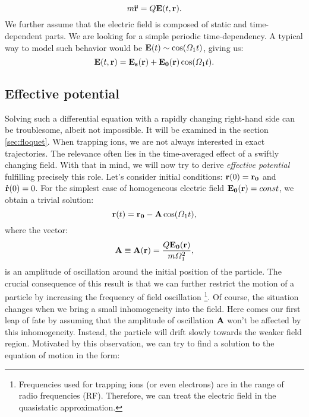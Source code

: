 \begin{equation}
	\label{equation of motion}
	m \vb{\ddot{r}} = Q \vb{E}(t,\vb{r}).
\end{equation}
We further assume that the electric field is composed of static and time-dependent parts. We are looking for a simple periodic time-dependency. A typical way to model such behavior would be $\vb{E}(t) \sim \cos(\Omega_1 t)$, giving us:
\begin{equation}
	\vb{E}(t,\vb{r}) = \vb{E_s}(\vb{r}) + \vb{E_0}(\vb{r}) \cos(\Omega_1 t).
\end{equation}
	\subsection{Effective potential}
Solving such a differential equation with a rapidly changing right-hand side can be troublesome, albeit not impossible. It will be examined in the section \ref{sec:floquet}. When trapping ions, we are not always interested in exact trajectories. The relevance often lies in the time-averaged effect of a swiftly changing field. With that in mind, we will now try to derive \emph{effective potential} fulfilling precisely this role.
Let's consider initial conditions: $\vb{r}(0) = \vb{r_0}$ and $\vb{\dot{r}}(0) = 0$. For the simplest case of homogeneous electric field $\vb{E_0}(\vb{r}) = const$, we obtain a trivial solution:
\begin{equation}
	\label{solution for homogenious field}
	\vb{r}(t) = \vb{r_0} - \vb{A} \cos(\Omega_1 t),
\end{equation}
where the vector: 
\begin{equation}
	\label{oscillation amplitude}
	\vb{A} \equiv \vb{A}(\vb{r}) = \frac{Q \vb{E_0}(\vb{r})}{m \Omega_1^2},
\end{equation}
is an amplitude of oscillation around the initial position of the particle. The crucial consequence of this result is that we can further restrict the motion of a particle by increasing the frequency of field oscillation \footnote{Frequencies used for trapping ions (or even electrons) are in the range of radio frequencies (RF). Therefore, we can treat the electric field in the quasistatic approximation.}. Of course, the situation changes when we bring a small inhomogeneity into the field. Here comes our first leap of fate by assuming that the amplitude of oscillation $\vb{A}$ won't be affected by this inhomogeneity. Instead, the particle will drift slowly towards the weaker field region. Motivated by this observation, we can try to find a solution to the equation of motion in the form:
